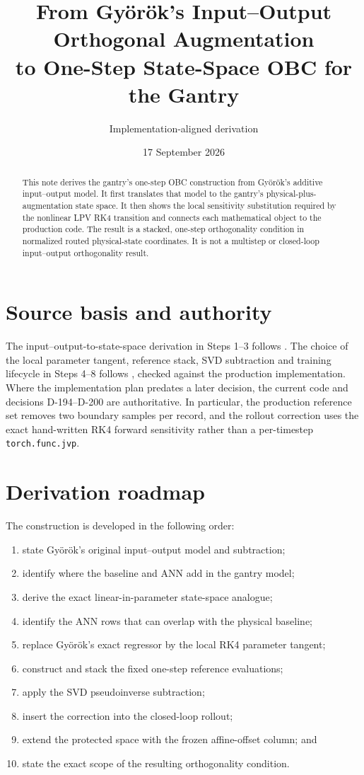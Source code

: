 \documentclass[11pt,a4paper]{article}
\title{From Gy\"or\"ok's Input--Output Orthogonal Augmentation\\
to One-Step State-Space OBC for the Gantry}
\author{Implementation-aligned derivation}
\date{17 September 2026}
\newcommand{\code}[1]{\texttt{#1}}
\begin{document}
\maketitle

\begin{abstract}
This note derives the gantry's one-step OBC construction from Gy\"or\"ok's
additive input--output model.  It first translates that model to the gantry's
physical-plus-augmentation state space.  It then shows
the local sensitivity substitution required by the nonlinear LPV RK4
transition and connects each mathematical object to the production code.  The
result is a stacked, one-step orthogonality condition in normalized routed
physical-state coordinates.  It is not a multistep or closed-loop
input--output orthogonality result.
\end{abstract}

\section*{Source basis and authority}

The input--output-to-state-space derivation in Steps 1--3 follows
.  The choice of the local
parameter tangent, reference stack, SVD subtraction and training lifecycle in
Steps 4--8 follows , checked
against the production implementation.  Where the implementation plan
predates a later decision, the current code and decisions D-194--D-200 are
authoritative.  In particular, the production reference set removes two
boundary samples per record, and the rollout correction uses the exact
hand-written RK4 forward sensitivity rather than a per-timestep
\code{torch.func.jvp}.

\section*{Derivation roadmap}

The construction is developed in the following order:
\begin{enumerate}
\item state Gy\"or\"ok's original input--output model and subtraction;
\item identify where the baseline and ANN add in the gantry model;
\item derive the exact linear-in-parameter state-space analogue;
\item identify the ANN rows that can overlap with the physical baseline;
\item replace Gy\"or\"ok's exact regressor by the local RK4 parameter tangent;
\item construct and stack the fixed one-step reference evaluations;
\item apply the SVD pseudoinverse subtraction;
\item insert the correction into the closed-loop rollout;
\item extend the protected space with the frozen affine-offset column; and
\item state the exact scope of the resulting orthogonality condition.
\end{enumerate}
\end{document}

